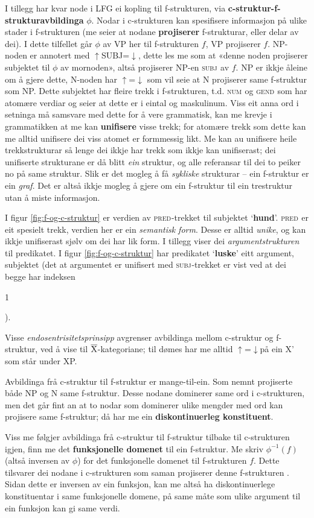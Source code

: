 \documentclass[12pt,a4paper,oneside,draft]{report}
\makeatletter
\newcommand{\xbar}{$\rm\overline{X}$}
\newcommand{\ind}[1]{{\avmoptions{center}\begin{avm}\@{#1}\end{avm}}}
\newcommand{\F}[2]{\textsc{#1}\ensuremath{_{#2}}}
\newcommand{\SUBJ}{\F{subj}{}}
\newcommand{\GEND}{\F{gend}{}}
\newcommand{\NUM}{\F{num}{}}
\newcommand{\PRED}{\F{pred}{}}
\newcommand{\ua}{\ensuremath{\uparrow}}
\newcommand{\da}{\ensuremath{\downarrow}}
\newcommand{\p}[1]{`\textbf{#1}'}
\makeatother
\begin{document}
 I tillegg har kvar node i LFG ei kopling til f-strukturen, via
 \textbf{c-struktur-f-strukturavbildinga} $\phi{}$. Nodar i c-strukturen kan
 spesifisere informasjon på ulike stader i f-strukturen (me seier at
 nodane \textbf{projiserer} f-strukturar, eller delar av dei).  I dette
 tilfellet går $\phi$ av VP her til f-strukturen $f$, VP projiserer
 $f$. NP-noden er annotert med \ua{}SUBJ=\da{}, dette les me som at
 «denne noden projiserer subjektet til $\phi$ av mornoden», altså
 projiserer NP-en \SUBJ{} av $f$. NP er ikkje åleine om å gjere dette,
 N-noden har \ua{}=\da{} som vil seie at N projiserer same f-struktur
 som NP. Dette subjektet har fleire trekk i f-strukturen, t.d. \NUM{}
 og \GEND{} som har atomære verdiar og seier at dette er i eintal og
 maskulinum. Viss eit anna ord i setninga må samsvare med dette for å
 vere grammatisk, kan me krevje i grammatikken at me kan \textbf{unifisere}
 visse trekk; for atomære trekk som dette kan me alltid unifisere dei
 viss atomet er formmessig likt. Me kan au unifisere heile
 trekkstrukturar så lenge dei ikkje har trekk som ikkje kan
 unifiserast; dei unifiserte strukturane er då blitt \emph{ein} struktur,
 og alle referansar til dei to peiker no på same struktur. Slik er det
 mogleg å få \emph{sykliske} strukturar -- ein f-struktur er ein
 \emph{graf}. Det er altså ikkje mogleg å gjere om ein f-struktur til ein
 trestruktur utan å miste informasjon.

 I figur \ref{fig:f-og-c-struktur} er verdien av \PRED{}-trekket til
 subjektet \p{hund}. \PRED{} er eit spesielt trekk, verdien her er ein
 \emph{semantisk form}. Desse er alltid \emph{unike}, og kan ikkje unifiserast
 sjølv om dei har lik form. I tillegg viser dei \emph{argumentstrukturen}
 til predikatet. I figur \ref{fig:f-og-c-struktur} har predikatet
 \p{luske} eitt argument, subjektet (det at argumentet er unifisert
 med \SUBJ{}-trekket er vist ved at dei begge har indeksen \ind{1}).

 Visse \emph{endosentrisitetsprinsipp} avgrenser avbildinga mellom
 c-struktur og f-struktur, ved å vise til \xbar-kategoriane; til dømes
 har me alltid \ua=\da på ein X' som står under XP.

 Avbildinga frå c-struktur til f-struktur er mange-til-ein. Som nemnt
 projiserte både NP og N same f-struktur. Desse nodane dominerer same
 ord i c-strukturen, men det går fint an at to nodar som dominerer
 ulike mengder med ord kan projisere same f-struktur; då har me ein
 \textbf{diskontinuerleg konstituent}.

 Viss me følgjer avbildinga frå c-struktur til f-struktur tilbake til
 c-strukturen igjen, finn me det \textbf{funksjonelle domenet} til ein
 f-struktur. Me skriv $\phi^{-1}(f)$ (altså inversen av $\phi$) for
 det funksjonelle domenet til f-strukturen $f$. Dette tilsvarer dei
 nodane i c-strukturen som saman projiserer denne f-strukturen
 \citep[s.~126]{bresnan2001lfs}. Sidan dette er inversen av ein
 funksjon, kan me altså ha diskontinuerlege konstituentar i same
 funksjonelle domene, på same måte som ulike argument til ein funksjon
 kan gi same verdi.
\end{document}
